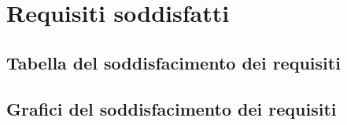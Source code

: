 \section{Requisiti soddisfatti}

\subsection{Tabella del soddisfacimento dei requisiti}

\subsection{Grafici del soddisfacimento dei requisiti}